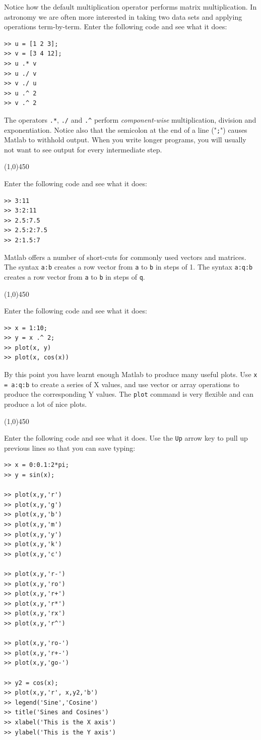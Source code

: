 \documentclass[12pt,a4paper]{article}   %
\newcommand{\code}[1]{\texttt{#1}}
\newcommand{\ruler}{
  \begin{center}
    \line(1,0){450}
  \end{center}
}
\begin{document}
Notice how the default multiplication operator performs matrix multiplication. In astronomy
we are often more interested in taking two data sets and applying operations term-by-term.
Enter the following code and see what it does:


\begin{verbatim}
>> u = [1 2 3];
>> v = [3 4 12];
>> u .* v
>> u ./ v
>> v ./ u
>> u .^ 2
>> v .^ 2
\end{verbatim}

The operators \code{.*}, \code{./} and \code{.\^} perform \textit{component-wise}
multiplication, division and exponentiation. Notice also that the semicolon at the
end of a line ("\code{;}") causes Matlab to withhold output. When you write longer
programs, you will usually not want to see output for every intermediate step.


\ruler

Enter the following code and see what it does:

\begin{verbatim}
>> 3:11
>> 3:2:11
>> 2.5:7.5
>> 2.5:2:7.5
>> 2:1.5:7
\end{verbatim}


Matlab offers a number of short-cuts for commonly used vectors and matrices. The syntax
\code{a:b} creates a row vector from \code{a} to \code{b} in steps of 1. The syntax
\code{a:q:b} creates a row vector from \code{a} to \code{b} in steps of \code{q}.


\ruler

Enter the following code and see what it does:

\begin{verbatim}
>> x = 1:10;
>> y = x .^ 2;
>> plot(x, y)
>> plot(x, cos(x))
\end{verbatim}

By this point you have learnt enough Matlab to produce many useful plots. Use
\code{x = a:q:b} to create a series of X values, and use vector or array operations
to produce the corresponding Y values. The \code{plot} command is very flexible
and can produce a lot of nice plots.

\ruler

Enter the following code and see what it does. Use the \code{Up} arrow key to pull
up previous lines so that you can save typing:


\begin{verbatim}
>> x = 0:0.1:2*pi;
>> y = sin(x);

>> plot(x,y,'r')
>> plot(x,y,'g')
>> plot(x,y,'b')
>> plot(x,y,'m')
>> plot(x,y,'y')
>> plot(x,y,'k')
>> plot(x,y,'c')

>> plot(x,y,'r-')
>> plot(x,y,'ro')
>> plot(x,y,'r+')
>> plot(x,y,'r*')
>> plot(x,y,'rx')
>> plot(x,y,'r^')

>> plot(x,y,'ro-')
>> plot(x,y,'r+-')
>> plot(x,y,'go-')

>> y2 = cos(x);
>> plot(x,y,'r', x,y2,'b')
>> legend('Sine','Cosine')
>> title('Sines and Cosines')
>> xlabel('This is the X axis')
>> ylabel('This is the Y axis')
\end{verbatim}
\end{document}
